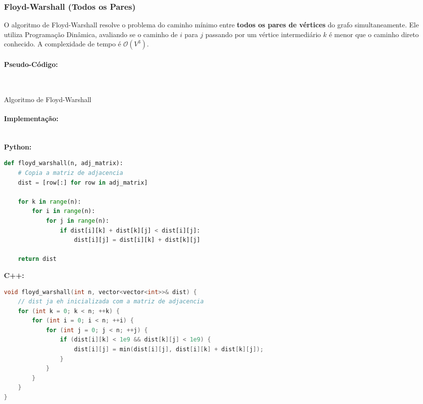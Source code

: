 
\subsubsection{Floyd-Warshall (Todos os Pares)}
O algoritmo de Floyd-Warshall resolve o problema do caminho mínimo entre
\textbf{todos os pares de vértices} do grafo simultaneamente. Ele utiliza
Programação Dinâmica, avaliando se o caminho de $i$ para $j$ passando por um
vértice intermediário $k$ é menor que o caminho direto conhecido. A
complexidade de tempo é $\mathcal{O}(V^3)$.

\paragraph{Pseudo-Código: }\mbox{}\\
\begin{algorithm}[H]
    \SetAlgoLined

    \caption{Algoritmo de Floyd-Warshall}
\end{algorithm}

\paragraph{Implementação: }\mbox{}\\
\textbf{Python: }
\begin{lstlisting}[language=Python]
def floyd_warshall(n, adj_matrix):
    # Copia a matriz de adjacencia
    dist = [row[:] for row in adj_matrix]
    
    for k in range(n):
        for i in range(n):
            for j in range(n):
                if dist[i][k] + dist[k][j] < dist[i][j]:
                    dist[i][j] = dist[i][k] + dist[k][j]
                    
    return dist
\end{lstlisting}

\vspace{0.3cm}
\textbf{C++:}
\begin{lstlisting}[language=C++]
void floyd_warshall(int n, vector<vector<int>>& dist) {
    // dist ja eh inicializada com a matriz de adjacencia
    for (int k = 0; k < n; ++k) {
        for (int i = 0; i < n; ++i) {
            for (int j = 0; j < n; ++j) {
                if (dist[i][k] < 1e9 && dist[k][j] < 1e9) {
                    dist[i][j] = min(dist[i][j], dist[i][k] + dist[k][j]);
                }
            }
        }
    }
}
\end{lstlisting}